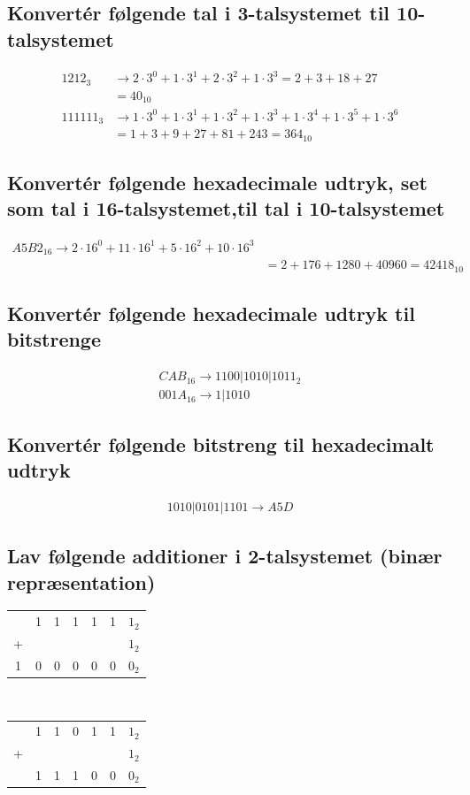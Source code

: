 \documentclass[12pt, a4paper]{article}
\begin{document}
			\subsection{Konvertér følgende tal i 3-talsystemet til 10-talsystemet}
				\begin{align*}
					1212_3&\rightarrow 2\cdot 3^0+1\cdot 3^1+2\cdot 3^2+1\cdot 3^3 = 2+3+18+27\\
					      &=40_{10}\\ 
					111111_3&\rightarrow 1\cdot 3^0+1\cdot 3^1+1\cdot 3^2+1\cdot3^3+1\cdot 3^4+1\cdot 3^5+1\cdot 3^6\\
						&=1+3+9+27+81+243=364_{10}
				\end{align*}
			\subsection{Konvertér følgende hexadecimale udtryk, set som tal i 16-talsystemet,til tal i 10-talsystemet}
				\begin{align*}
					A5B2_{16}\rightarrow 2\cdot 16^0+11\cdot 16^1+5\cdot 16^2+10\cdot 16^3\\
					&= 2+176+1280+40960=42418_{10}
				\end{align*}
			\subsection{Konvertér følgende hexadecimale udtryk til bitstrenge}
				\begin{align*}
					CAB_{16}\rightarrow 1100|1010|1011_2\\
					001A_{16}\rightarrow 1|1010
				\end{align*}
			\subsection{Konvertér følgende bitstreng til hexadecimalt udtryk}
				\begin{align*}
					1010|0101|1101\rightarrow A5D
				\end{align*}
			\subsection{Lav følgende additioner i 2-talsystemet (binær repræsentation)}
				\begin{tabular}{ccccccc}
				  & 1 & 1 & 1 & 1& 1 & $1_2$ \\
				+ &  & & & & & $1_2$\\
				\hline
				 1 & 0 & 0 & 0 & 0 & 0 & $0_2$ \\
				\end{tabular}\\[5mm]
				\begin{tabular}{ccccccc}
				  & 1 & 1 & 0 & 1& 1 & $1_2$ \\
				+ &  & & & & & $1_2$\\
				\hline
				  & 1 & 1 & 1 & 0 & 0 & $0_2$ \\
				\end{tabular}
\end{document}
